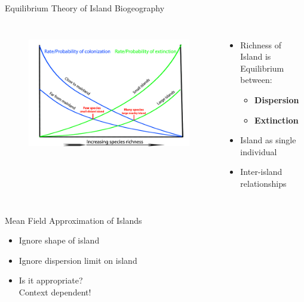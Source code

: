 \documentclass{beamer}
\begin{document}
\begin{frame}{Equilibrium Theory of Island Biogeography}
\begin{columns}[c]
	\column{6cm}
	\begin{figure}[ht]
		\centering
		\includegraphics[scale=1.2]{fig/APIS/IBT.jpg}
		\label{IBT}
	\end{figure}
	
	\column{6cm}
	\begin{itemize}
		\item Richness of Island is Equilibrium between: 
		\begin{itemize}
			\item \textbf{Dispersion}
			\item \textbf{Extinction}
		\end{itemize}
		\item Island as single individual
		\item Inter-island relationships
	\end{itemize}
\end{columns}
\end{frame}



\begin{frame}{Mean Field Approximation of Islands}
	\begin{itemize}
		\item Ignore shape of island
		\item Ignore dispersion limit on island\pause
		\item Is it appropriate? \\Context dependent!
	\end{itemize}
\end{frame}
\end{document}
